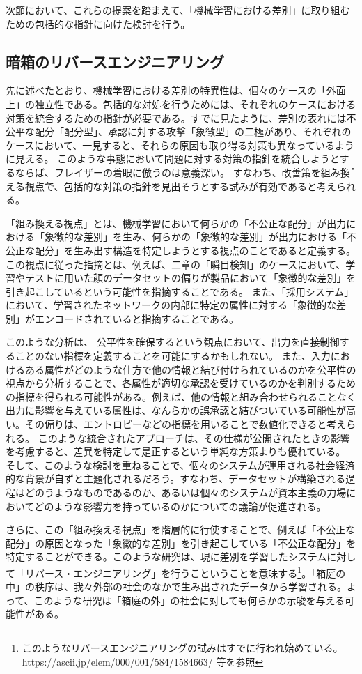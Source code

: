\documentclass[b5j,twoside,twocolumn]{utarticle}
\begin{document}
次節において、これらの提案を踏まえて、「機械学習における差別」に取り組むための包括的な指針に向けた検討を行う。

\subsection{暗箱のリバースエンジニアリング}
先に述べたとおり、機械学習における差別の特異性は、個々のケースの「外面上」の独立性である。包括的な対処を行うためには、それぞれのケースにおける対策を統合するための指針が必要である。すでに見たように、差別の表れには不公平な配分「配分型」、承認に対する攻撃「象徴型」の二極があり、それぞれのケースにおいて、一見すると、それらの原因も取り得る対策も異なっているように見える。
このような事態において問題に対する対策の指針を統合しようとするならば、フレイザーの着眼に倣うのは意義深い。
すなわち、改善策を\.組\.み\.換\.え\.る\.視\.点で、包括的な対策の指針を見出そうとする試みが有効であると考えられる。


「組み換える視点」とは、機械学習において何らかの「不公正な配分」が出力における「象徴的な差別」を生み、何らかの「象徴的な差別」が出力における「不公正な配分」を生み出す構造を特定しようとする視点のことであると定義する。この視点に従った指摘とは、例えば、二章の「瞬目検知」のケースにおいて、学習やテストに用いた顔のデータセットの偏りが製品において「象徴的な差別」を引き起こしているという可能性を指摘することである。
また、「採用システム」において、学習されたネットワークの内部に特定の属性に対する「象徴的な差別」がエンコードされていると指摘することである。


このような分析は、
公平性を確保するという観点において、出力を直接制御することのない指標を定義することを可能にするかもしれない。
また、入力におけるある属性がどのような仕方で他の情報と結び付けられているのかを公平性の視点から分析することで、各属性が適切な承認を受けているのかを判別するための指標を得られる可能性がある。例えば、他の情報と組み合わせられることなく出力に影響を与えている属性は、なんらかの誤承認と結びついている可能性が高い。その偏りは、エントロピーなどの指標を用いることで数値化できると考えられる。
このような統合されたアプローチは、その仕様が公開されたときの影響を考慮すると、差異を特定して是正するという単純な方策よりも優れている。
そして、このような検討を重ねることで、個々のシステムが運用される社会経済的な背景が自ずと主題化されるだろう。すなわち、データセットが構築される過程はどのうようなものであるのか、あるいは個々のシステムが資本主義の力場においてどのような影響力を持っているのかについての議論が促進される。


さらに、この「組み換える視点」を階層的に行使することで、例えば「不公正な配分」の原因となった「象徴的な差別」を引き起こしている「不公正な配分」を特定することができる。このような研究は、現に差別を学習したシステムに対して「リバース・エンジニアリング」を行うこということを意味する\footnote{このようなリバースエンジニアリングの試みはすでに行われ始めている。\cite{Tan_2018} https://ascii.jp/elem/000/001/584/1584663/ 等を参照}。「箱庭の中」の秩序は、我々外部の社会のなかで生み出されたデータから学習される。よって、このような研究は「箱庭の外」の社会に対しても何らかの示唆を与える可能性がある。
\end{document}
